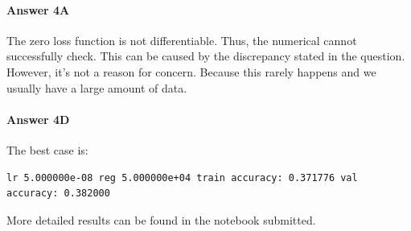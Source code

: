 \documentclass[paper=a4, fontsize=11pt]{scrartcl} %
\numberwithin{equation}{section} %
\numberwithin{figure}{section} %
\numberwithin{table}{section} %
\begin{document}
\paragraph{\textbf{Answer 4A}}
The zero loss function is not differentiable. Thus, the numerical cannot successfully check. This can be caused by the discrepancy stated in the question.
\\ However, it's not a reason for concern. Because this rarely happens and we usually have a large amount of data.
\paragraph{\textbf{Answer 4D}}
The best case is: 
\begin{verbatim}
lr 5.000000e-08 reg 5.000000e+04 train accuracy: 0.371776 val accuracy: 0.382000
\end{verbatim}
More detailed results can be found in the notebook submitted.
\end{document}
